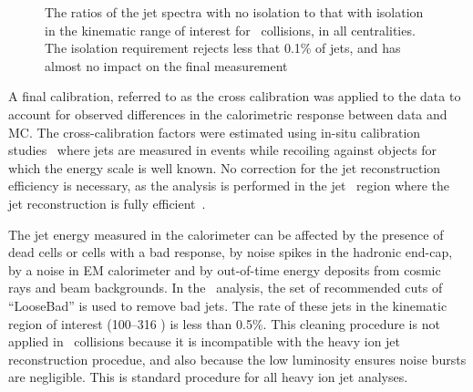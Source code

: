 \begin{figure}
\caption{The ratios of the jet spectra with no isolation to that with isolation in the kinematic range of interest for \pbpb\ collisions, in all centralities. The isolation requirement rejects less that 0.1\% of jets, and has almost no impact on the final measurement}
\label{fig:ISO}
\end{figure}  



A final calibration, referred to as the cross calibration \cite{cc2015} 
was applied to the data to account for observed differences in the calorimetric response between data and MC. The cross-calibration factors were estimated using in-situ calibration studies~\cite{HIjesnote} where jets are measured in events while recoiling against objects for which the energy scale is well known. 
No correction for the jet reconstruction efficiency is necessary, as the analysis is performed in the jet \pT\ region where the jet reconstruction is fully efficient~\cite{2015392}. 

The jet energy measured in the calorimeter can be affected by the presence 
of dead cells or cells with a bad response, by noise spikes in the hadronic end-cap, by a noise in EM calorimeter and by out-of-time energy deposits from cosmic rays and beam backgrounds. In the \pp\ analysis, the set of recommended cuts of ``LooseBad'' is used to remove bad jets. The rate of these jets in the kinematic region of interest (100--316 \GeV) is less than 0.5\%. This cleaning procedure is not applied in \PbPb\ collisions because it is incompatible with the heavy ion jet reconstruction procedue, and also because the low luminosity ensures noise bursts are negligible. This is standard procedure for all heavy ion jet analyses.
 

